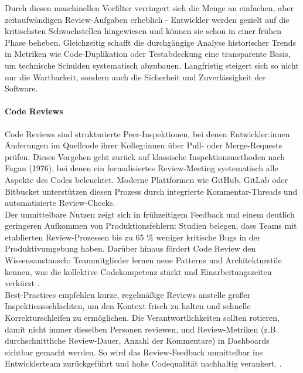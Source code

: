 Durch diesen maschinellen Vorfilter verringert sich die Menge an einfachen, 
aber zeitaufwändigen Review-Aufgaben erheblich - Entwickler werden gezielt auf die kritischsten Schwachstellen hingewiesen und können sie schon in einer frühen Phase beheben.\cite{ayewah2008using}
Gleichzeitig schafft die durchgängige Analyse historischer Trends in Metriken wie Code-Duplikation oder Testabdeckung eine transparente Basis, um technische Schulden systematisch abzubauen. 
Langfristig steigert sich so nicht nur die Wartbarkeit, sondern auch die Sicherheit und Zuverlässigkeit der Software. \cite{sonarqube-docs-2023}

\paragraph{Code Reviews}
Code Reviews sind strukturierte Peer-Inspektionen, bei denen Entwickler:innen Änderungen im Quellcode ihrer Kolleg:innen
über Pull- oder Merge-Requests prüfen. Dieses Vorgehen geht zurück auf klassische Inspektionsmethoden nach Fagan (1976),
bei denen ein formalisiertes Review-Meeting systematisch alle Aspekte des Codes beleuchtet.\cite{fagan1976design}
Moderne Plattformen wie GitHub, GitLab oder Bitbucket unterstützen diesen Prozess durch integrierte Kommentar-Threads
und automatisierte Review-Checks. \cite{atlassian2024code,cohen2010business} \\

Der unmittelbare Nutzen zeigt sich in frühzeitigem Feedback und einem deutlich geringeren Aufkommen von Produktionsfehlern: 
Studien belegen, dass Teams mit etablierten Review-Prozessen bis zu
65 \% weniger kritische Bugs in der Produktivumgebung haben.\cite{bacchelli2013expectations}
Darüber hinaus fördert Code Review den Wissensaustausch:
Teammitglieder lernen neue Patterns und Architekturstile kennen,
was die kollektive Codekompetenz stärkt und Einarbeitungszeiten verkürzt \cite{rigby2013modern}. \\

Best-Practices empfehlen kurze, regelmäßige Reviews anstelle großer Inspektionsschlachten,
um den Kontext frisch zu halten und schnelle Korrekturschleifen zu ermöglichen. Die Verantwortlichkeiten sollten rotieren,
damit nicht immer dieselben Personen reviewen, und Review-Metriken (z.B. durchschnittliche Review-Dauer, Anzahl der Kommentare)
in Dashboards sichtbar gemacht werden. So wird das Review-Feedback unmittelbar ins Entwicklerteam zurückgeführt und hohe
Codequalität nachhaltig verankert. \cite{atlassian2024code,rigby2013modern}.

